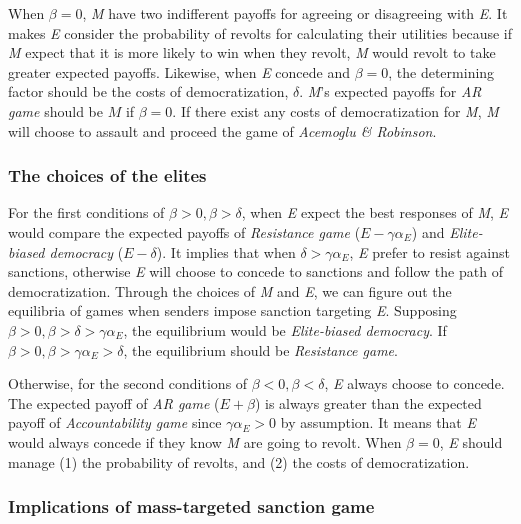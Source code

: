 \documentclass[11pt, letterpage]{article}
\begin{document}
When $\beta = 0$, \textit{M} have two indifferent payoffs for agreeing or disagreeing with \textit{E}. It makes \textit{E} consider the probability of revolts for calculating their utilities because if \textit{M} expect that it is more likely to win when they revolt, \textit{M} would revolt to take greater expected payoffs.    Likewise, when \textit{E} concede and $\beta = 0$, the determining factor should be the costs of democratization, $\delta$. \textit{M}'s expected payoffs for \textit{AR game} should be $M$ if $\beta = 0$. If there exist any costs of democratization for \textit{M}, \textit{M} will choose to assault and proceed the game of \textit{Acemoglu \& Robinson}. 
	
\subsubsection*{The choices of the elites}
	
For the first conditions of $\beta > 0, \beta > \delta$, when \textit{E} expect the best responses of \textit{M}, \textit{E} would compare the expected payoffs of \textit{Resistance game} ($E-\gamma\alpha_{E}$) and \textit{Elite-biased democracy} ($E-\delta$). It implies that when $\delta > \gamma\alpha_{E}$, \textit{E} prefer to resist against sanctions, otherwise \textit{E} will choose to concede to sanctions and follow the path of democratization. Through the choices of \textit{M} and \textit{E}, we can figure out the equilibria of games when senders impose sanction targeting \textit{E}. Supposing $\beta > 0, \beta > \delta > \gamma\alpha_{E}$, the equilibrium would be \textit{Elite-biased democracy}. If $\beta > 0, \beta > \gamma\alpha_{E} > \delta$, the equilibrium should be \textit{Resistance game}.
	
Otherwise, for the second conditions of $\beta <0, \beta < \delta$, \textit{E} always choose to concede. The expected payoff of \textit{AR game} ($E + \beta$) is always greater than the expected payoff of \textit{Accountability game} since $\gamma\alpha_{E} > 0$ by assumption. It means that \textit{E} would always concede if they know \textit{M} are going to revolt. When $\beta = 0$, \textit{E} should manage (1) the probability of revolts, and (2) the costs of democratization.
	
\subsubsection*{Implications of mass-targeted sanction game}
\end{document}
